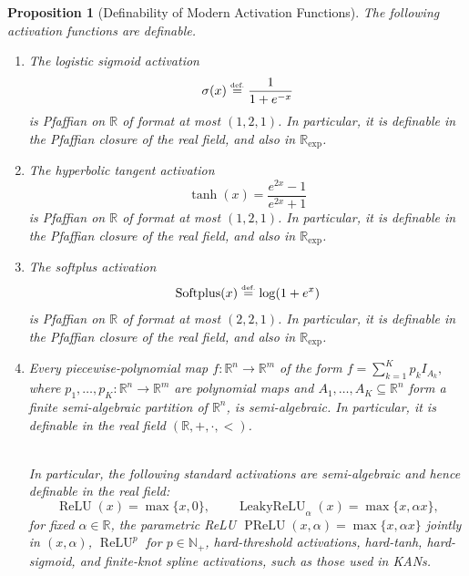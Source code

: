 \documentclass{article}
\newcommand{\eqdef}{\ensuremath{\stackrel{\mbox{\upshape\tiny def.}}{=}}}
\theoremstyle{plain}
\newtheorem{proposition}[theorem]{Proposition}
\theoremstyle{definition}
\theoremstyle{remark}
\theoremstyle{plain}
\numberwithin{thm}{section}
\theoremstyle{definition}
\numberwithin{equation}{section}
\begin{document}
\begin{proposition}[Definability of Modern Activation Functions]
\label{prop:modern_activations_definable}
The following activation functions are definable.

\begin{enumerate}

    \item[(i)] The logistic sigmoid activation
    \[
        \sigma(x)
        \eqdef
        \frac{1}{1+e^{-x}}
    \]
    is Pfaffian on $\mathbb{R}$ of format at most $(1,2,1)$.  In particular, it is definable in the Pfaffian closure of the real field, and also in $\mathbb{R}_{\exp}$.

    \item[(ii)] The hyperbolic tangent activation
\[
    \tanh(x)
    =
    \frac{e^{2x}-1}{e^{2x}+1}
\]
is Pfaffian on $\mathbb{R}$ of format at most $(1,2,1)$. In particular, it is
definable in the Pfaffian closure of the real field, and also in
$\mathbb{R}_{\exp}$.

    \item[(iii)] The softplus activation
\[
    \operatorname{Softplus}(x)
    \eqdef
    \log(1+e^x)
\]
is Pfaffian on \(\mathbb{R}\) of format at most \((2,2,1)\). In particular,
it is definable in the Pfaffian closure of the real field, and also in
\(\mathbb{R}_{\exp}\).
    
    \item[(iv)] Every piecewise-polynomial map
    $
        f:\mathbb{R}^n\to\mathbb{R}^m
    $
    of the form
    $
        f=\sum_{k=1}^K p_k I_{A_k},
    $
    where $p_1,\dots,p_K:\mathbb{R}^n\to\mathbb{R}^m$ are polynomial maps and $A_1,\dots,A_K\subseteq\mathbb{R}^n$ form a finite semi-algebraic partition of $\mathbb{R}^n$, is semi-algebraic.  In particular, it is definable in the real field $(\mathbb{R},+,\cdot,<)$.  
    
    \hfill\\
    In particular, the following standard activations are semi-algebraic and hence definable in the real field:
    \[
        \operatorname{ReLU}(x)=\max\{x,0\}, 
        \qquad
        \operatorname{LeakyReLU}_{\alpha}(x)=\max\{x,\alpha x\},
    \]
    for fixed $\alpha\in\mathbb{R}$, the parametric ReLU
    $
        \operatorname{PReLU}(x,\alpha)=\max\{x,\alpha x\}
    $
    jointly in $(x,\alpha)$, $\operatorname{ReLU}^p$ for $p\in\mathbb{N}_+$, hard-threshold activations, hard-tanh, hard-sigmoid, and finite-knot spline activations, such as those used in KANs.


\end{enumerate}
\end{proposition}
\end{document}

